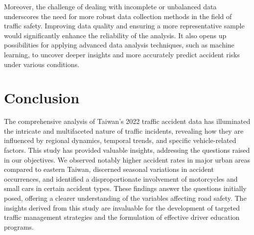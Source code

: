 \documentclass[a4paper, oneside, final, 12pt]{scrartcl} %
\begin{document}
Moreover, the challenge of dealing with incomplete or unbalanced data underscores 
the need for more robust data collection methods in the field of traffic safety. 
Improving data quality and ensuring a more representative sample would significantly 
enhance the reliability of the analysis. It also opens up possibilities for 
applying advanced data analysis techniques, such as machine learning, 
to uncover deeper insights and more accurately predict accident risks under various conditions.

\section{Conclusion}

The comprehensive analysis of Taiwan's 2022 traffic accident data has illuminated 
the intricate and multifaceted nature of traffic incidents, 
revealing how they are influenced by regional dynamics, temporal trends, 
and specific vehicle-related factors. This study has provided valuable insights, 
addressing the questions raised in our objectives. 
We observed notably higher accident rates in major urban areas compared to eastern Taiwan, 
discerned seasonal variations in accident occurrences, 
and identified a disproportionate involvement of motorcycles and small cars in 
certain accident types. These findings answer the questions initially posed, 
offering a clearer understanding of the variables affecting road safety. 
The insights derived from this study are invaluable for the development of 
targeted traffic management strategies and the formulation of effective driver 
education programs. 



\endgroup

\end{document}
